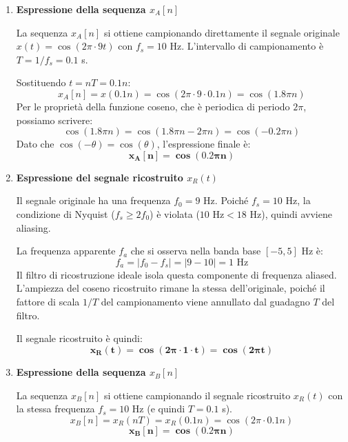 
\begin{soluzione}{20}
    \begin{enumerate}
        \item \textbf{Espressione della sequenza $x_A[n]$}
        
        La sequenza $x_A[n]$ si ottiene campionando direttamente il segnale originale $x(t) = \cos(2\pi \cdot 9t)$ con $f_s = 10$ Hz. L'intervallo di campionamento è $T = 1/f_s = 0.1$ s.
        
        Sostituendo $t = nT = 0.1n$:
        \[
            x_A[n] = x(0.1n) = \cos(2\pi \cdot 9 \cdot 0.1n) = \cos(1.8\pi n)
        \]
        Per le proprietà della funzione coseno, che è periodica di periodo $2\pi$, possiamo scrivere:
        \[
            \cos(1.8\pi n) = \cos(1.8\pi n - 2\pi n) = \cos(-0.2\pi n)
        \]
        Dato che $\cos(-\theta) = \cos(\theta)$, l'espressione finale è:
        \[
            \mathbf{x_A[n] = \cos(0.2\pi n)}
        \]
        
        \item \textbf{Espressione del segnale ricostruito $x_R(t)$}
        
        Il segnale originale ha una frequenza $f_0 = 9$ Hz. Poiché $f_s = 10$ Hz, la condizione di Nyquist ($f_s \ge 2f_0$) è violata ($10 \text{ Hz} < 18 \text{ Hz}$), quindi avviene aliasing.
        
        La frequenza apparente $f_a$ che si osserva nella banda base $[-5, 5]$ Hz è:
        \[
            f_a = |f_0 - f_s| = |9 - 10| = 1 \text{ Hz}
        \]
        Il filtro di ricostruzione ideale isola questa componente di frequenza aliased. L'ampiezza del coseno ricostruito rimane la stessa dell'originale, poiché il fattore di scala $1/T$ del campionamento viene annullato dal guadagno $T$ del filtro.
        
        Il segnale ricostruito è quindi:
        \[
            \mathbf{x_R(t) = \cos(2\pi \cdot 1 \cdot t) = \cos(2\pi t)}
        \]
        
        \item \textbf{Espressione della sequenza $x_B[n]$}
        
        La sequenza $x_B[n]$ si ottiene campionando il segnale ricostruito $x_R(t)$ con la stessa frequenza $f_s=10$ Hz (e quindi $T=0.1$ s).
        \[
            x_B[n] = x_R(nT) = x_R(0.1n) = \cos(2\pi \cdot 0.1n)
        \]
        \[
            \mathbf{x_B[n] = \cos(0.2\pi n)}
        \]
        

\end{enumerate}
\end{soluzione}
